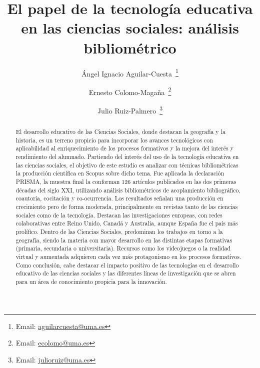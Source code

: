 \documentclass[spanish]{textolivre}
\title{El papel de la tecnología educativa en las ciencias sociales: análisis bibliométrico}
\author[1]{Ángel Ignacio Aguilar-Cuesta~\orcid{0000-0003-3240-0810}\thanks{Email: \href{aguilarcuesta@uma.es}{aguilarcuesta@uma.es}}}
\author[1]{Ernesto Colomo-Magaña~\orcid{0000-0002-3527-7937}\thanks{Email: \href{ecolomo@uma.es}{ecolomo@uma.es}}}
\author[1]{Julio Ruiz-Palmero~\orcid{0000-0002-6958-0926}\thanks{Email: \href{julioruiz@uma.es}{julioruiz@uma.es}}}
\affil[1]{Universidad de Málaga, Facultad de Ciencias de la Educación, Departamento de Didáctica y Organización Escolar, Málaga, España.}
\begin{document}
\maketitle

\begin{polyabstract}
\begin{abstract}
El desarrollo educativo de las Ciencias Sociales, donde destacan la geografía y la historia, es un terreno propicio para incorporar los avances tecnológicos con aplicabilidad al enriquecimiento de los procesos formativos y la mejora del interés y rendimiento del alumnado. Partiendo del interés del uso de la tecnología educativa en las ciencias sociales, el objetivo de este estudio es analizar con técnicas bibliométricas la producción científica en Scopus sobre dicho tema. Fue aplicada la declaración PRISMA, la muestra final la conforman 126 artículos publicados en las dos primeras décadas del siglo XXI, utilizando análisis bibliométricos de acoplamiento bibliográfico, coautoría, cocitación y co-ocurrencia. Los resultados señalan una producción en crecimiento pero de forma moderada, principalmente en revistas tanto de las ciencias sociales como de la tecnología. Destacan las investigaciones europeas, con redes colaborativas entre Reino Unido, Canadá y Australia, aunque España fue el país más prolífico. Dentro de las Ciencias Sociales, predominan los trabajos en torno a la geografía, siendo la materia con mayor desarrollo en las distintas etapas formativas (primaria, secundaria o universitaria). Recursos como los videojuegos o la realidad virtual y aumentada adquieren cada vez más protagonismo en los procesos formativos. Como conclusión, cabe destacar el impacto positivo de las tecnologías en el desarrollo educativo de las ciencias sociales y las diferentes líneas de investigación que se abren para un área de conocimiento propicia para la innovación.

\end{abstract}


\end{polyabstract}
\end{document}
